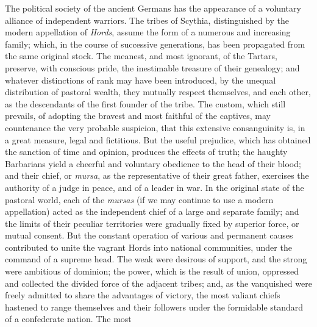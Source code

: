 
The political society of the ancient Germans has the appearance
of a voluntary alliance of independent warriors. The tribes of
Scythia, distinguished by the modern appellation of \textit{Hords},
assume the form of a numerous and increasing family; which, in
the course of successive generations, has been propagated from
the same original stock. The meanest, and most ignorant, of the
Tartars, preserve, with conscious pride, the inestimable treasure
of their genealogy; and whatever distinctions of rank may have
been introduced, by the unequal distribution of pastoral wealth,
they mutually respect themselves, and each other, as the
descendants of the first founder of the tribe. The custom, which
still prevails, of adopting the bravest and most faithful of the
captives, may countenance the very probable suspicion, that this
extensive consanguinity is, in a great measure, legal and
fictitious. But the useful prejudice, which has obtained the
sanction of time and opinion, produces the effects of truth; the
haughty Barbarians yield a cheerful and voluntary obedience to
the head of their blood; and their chief, or \textit{mursa}, as the
representative of their great father, exercises the authority of
a judge in peace, and of a leader in war. In the original state
of the pastoral world, each of the \textit{mursas} (if we may continue
to use a modern appellation) acted as the independent chief of a
large and separate family; and the limits of their peculiar
territories were gradually fixed by superior force, or mutual
consent. But the constant operation of various and permanent
causes contributed to unite the vagrant Hords into national
communities, under the command of a supreme head. The weak were
desirous of support, and the strong were ambitious of dominion;
the power, which is the result of union, oppressed and collected
the divided force of the adjacent tribes; and, as the vanquished
were freely admitted to share the advantages of victory, the most
valiant chiefs hastened to range themselves and their followers
under the formidable standard of a confederate nation. The most

